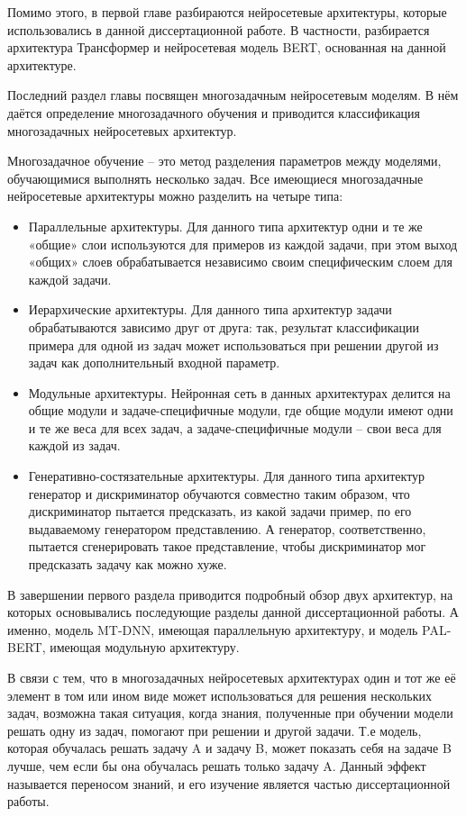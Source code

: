 Помимо этого, в первой главе разбираются нейросетевые архитектуры, которые использовались в данной диссертационной работе. В частности, разбирается архитектура Трансформер и нейросетевая модель {BERT}, основанная на данной архитектуре.

Последний раздел главы посвящен многозадачным нейросетевым моделям. В нём даётся определение многозадачного обучения и приводится классификация многозадачных нейросетевых архитектур.

Многозадачное обучение -- это метод разделения параметров между моделями, обучающимися выполнять несколько задач. Все имеющиеся многозадачные нейросетевые архитектуры можно разделить на четыре типа:
\begin{itemize}
\item Параллельные архитектуры. Для данного типа архитектур одни и те же «общие» слои используются для примеров из каждой задачи, при этом выход «общих» слоев обрабатывается независимо своим специфическим слоем для каждой задачи. 
\item Иерархические архитектуры. Для данного типа архитектур задачи обрабатываются зависимо друг от друга: так, результат классификации примера для одной из задач может использоваться при решении другой из задач как дополнительный входной параметр.
\item Модульные архитектуры. Нейронная сеть в данных архитектурах делится на общие модули и задаче-специфичные модули, где общие модули имеют одни и те же веса для всех задач, а задаче-специфичные модули -- свои веса для каждой из задач.
\item Генеративно-состязательные архитектуры. Для данного типа архитектур генератор и дискриминатор обучаются совместно таким образом, что дискриминатор пытается предсказать, из какой задачи пример, по его выдаваемому генератором представлению. А генератор, соответственно, пытается сгенерировать такое представление, чтобы дискриминатор мог предсказать задачу как можно хуже. 
\end{itemize}
В завершении первого раздела приводится подробный обзор двух архитектур, на которых основывались последующие разделы данной диссертационной работы. А именно, модель {MT-DNN}, имеющая параллельную архитектуру, и модель {PAL-BERT}, имеющая модульную архитектуру. 

В связи с тем, что в многозадачных нейросетевых архитектурах один и тот же её элемент в том или ином виде может использоваться для решения нескольких задач, возможна такая ситуация, когда знания, полученные при обучении модели решать одну из задач, помогают при решении и другой задачи. Т.е модель, которая обучалась решать задачу A и задачу B, может показать себя на задаче B лучше, чем если бы она обучалась решать только задачу A. Данный эффект называется переносом знаний, и его изучение является частью диссертационной работы.

